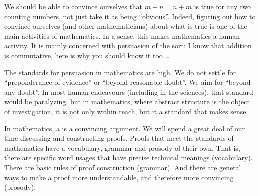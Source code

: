 We should be able to convince ourselves that $m+n = n+m$ is true for any two counting numbers, not just take it as being ``obvious''. 
Indeed, figuring out how to convince ourselves (and other mathematicians) about what is true is one of the main activities of mathematics.
In a sense, this makes mathematics a human activity.
It is mainly concerned with persuasion of the sort: I know that addition is commutative, here is why you should know it too \ldots

The standards for persuasion in mathematics are high. 
We do not settle for ``preponderance of evidence'' or ``beyond reasonable doubt''.
We aim for ``beyond any doubt''. 
In most human endeavours (including in the sciences), that standard would be paralyzing, but in mathematics, where abstract structure is the object of investigation, it is not only within reach, but it a standard that makes sense.

In mathematics, a  is a convincing argument.
We will spend a great deal of our time discussing and constructing proofs.
Proofs that meet the standards of mathematics have a vocabulary, grammar and prosody of their own.
That is, there are specific word usages that have precise technical meanings (vocabulary).
There are basic rules of proof construction (grammar).
And there are general ways to make a proof more understandable, and therefore more convincing (prosody).

